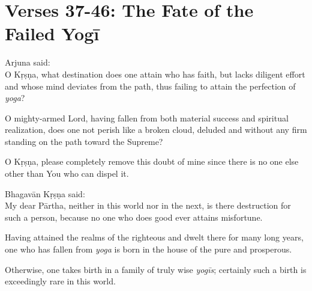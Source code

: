 \section{Verses 37-46: The Fate of the Failed Yogī}\label{sec-verses-37-46-the-fate-of-the-failed-yogi}

{\hspace*{1em}Arjuna said: \\
O Kṛṣṇa, what destination does one attain who has faith, but lacks diligent effort and whose mind deviates from the path, thus failing to attain the perfection of \textit{yoga}?}

{O mighty-armed Lord, having fallen from both material success and spiritual realization, does one not perish like a broken cloud, deluded and without any firm standing on the path toward the Supreme?}

{O Kṛṣṇa, please completely remove this doubt of mine since there is no one else other than You who can dispel it.}

{\hspace*{1em}Bhagavān Kṛṣṇa said: \\
My dear Pārtha, neither in this world nor in the next, is there destruction for such a person, because no one who does good ever attains misfortune.}

{Having attained the realms of the righteous and dwelt there for many long years, one who has fallen from \textit{yoga} is born in the house of the pure and prosperous.}

{Otherwise, one takes birth in a family of truly wise \textit{yogīs}; certainly such a birth is exceedingly rare in this world.}

